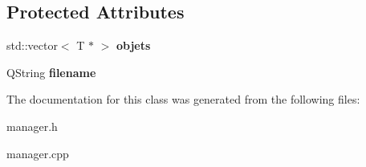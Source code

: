 \subsection*{Protected Attributes}
\begin{DoxyCompactItemize}
\item 
\mbox{\label{class_manager_a1da8f0213719b1f4e7eab848835f77dd}} 
std\+::vector$<$ T $\ast$ $>$ {\bfseries objets}
\item 
\mbox{\label{class_manager_a312ccc5f1d3cf73f9c76b32777f1bcf9}} 
Q\+String {\bfseries filename}
\end{DoxyCompactItemize}


The documentation for this class was generated from the following files\+:\begin{DoxyCompactItemize}
\item 
manager.\+h\item 
manager.\+cpp\end{DoxyCompactItemize}
